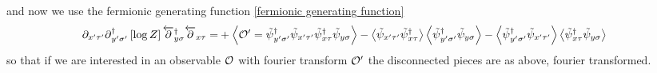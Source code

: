 and now we use the fermionic generating function \eqref{fermionic generating function}
\begin{align}
	\partial_{x'\tau'} \partial{}^{\dagger}_{y'\sigma'} \left[\log Z\right] \overleftarrow{\partial}{}^{\dagger}_{y\sigma} \overleftarrow{\partial}_{x\tau}
	=&
	+\left\langle \mathcal{O}' = \tilde{\psi}{}^{\dagger}_{y'\sigma'} \tilde{\psi}_{x'\tau'} \tilde{\psi}{}^{\dagger}_{x\tau} \tilde{\psi}_{y\sigma} \right\rangle
	-\left\langle \tilde{\psi}_{x'\tau'} \tilde{\psi}{}^{\dagger}_{x\tau} \right\rangle \left\langle \tilde{\psi}{}^{\dagger}_{y'\sigma'} \tilde{\psi}_{y\sigma} \right\rangle
	-\left\langle \tilde{\psi}{}^{\dagger}_{y'\sigma'} \tilde{\psi}_{x'\tau'} \right\rangle \left\langle \tilde{\psi}{}^{\dagger}_{x\tau} \tilde{\psi}_{y\sigma} \right\rangle
\end{align}
so that if we are interested in an observable $\mathcal{O}$ with fourier transform $\mathcal{O}'$ the disconnected pieces are as above, fourier transformed.
